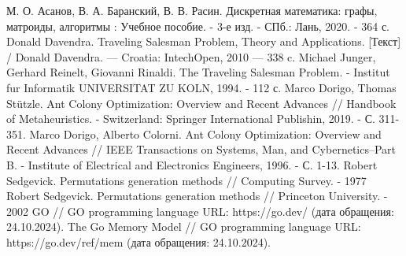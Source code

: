 \begin{thebibliography}{}
	 М. О. Асанов, В. А. Баранский, В. В. Расин. Дискретная математика: графы, матроиды, алгоритмы : Учебное пособие. - 3-е изд. - СПб.: Лань, 2020. - 364 с.
	 Donald Davendra. Traveling Salesman Problem, Theory and Applications. [Текст] / Donald Davendra. — Croatia: IntechOpen, 2010 — 338 c.
	 Michael Junger, Gerhard Reinelt, Giovanni Rinaldi. The Traveling Salesman Problem. - Institut fur Informatik UNIVERSITAT ZU KOLN, 1994. - 112 с.
	 Marco Dorigo, Thomas Stützle. Ant Colony Optimization: Overview and Recent Advances // Handbook of Metaheuristics. - Switzerland: Springer International Publishin, 2019. - С. 311-351.
	 Marco Dorigo, Alberto Colorni. Ant Colony Optimization: Overview and Recent Advances // IEEE Transactions on Systems, Man, and Cybernetics–Part B. - Institute of Electrical and Electronics Engineers, 1996. - С. 1-13.
	 Robert Sedgevick. Permutations generation methods // Computing Survey. - 1977
	 Robert Sedgevick. Permutations generation methods // Princeton University. - 2002
	 GO // GO programming language URL: https://go.dev/ (дата обращения: 24.10.2024).
	 The Go Memory Model // GO programming language URL: https://go.dev/ref/mem (дата обращения: 24.10.2024).

\end{thebibliography}
